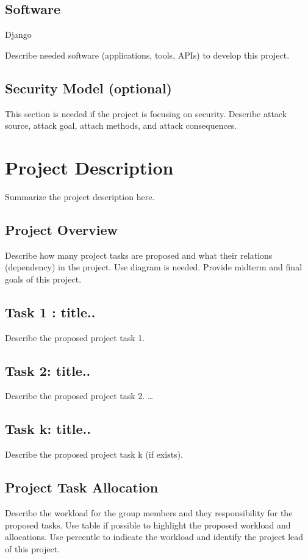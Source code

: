 \documentclass[conference,12pt]{IEEEtran}
\begin{document}
\subsection{Software}


Django \autocite{_django_2014}
\autocite{_toastdriven/django-tastypie_2014}
\autocite{_seshat_2014}
\autocite{_fritzy/sleekxmpp_2014}
\autocite{elliando_dias_django_2014}
\autocite{_twonds/punjab_2014}
\autocite{paterson_bidirectional-streams_2010}
\autocite{adam_fortuna_xmpp_2011}
\autocite{_strophe_2014}
\autocite{_ejabberd}
\autocite{steffen_larsen_xmpp}

Describe needed software (applications, tools, APIs) to develop this project.
\subsection{Security Model (optional)}
This section is needed if the project is focusing on security. Describe attack source, attack goal, attach methods, and attack consequences. 
\section{Project Description}
Summarize the project description here.
\subsection{Project Overview}
Describe how many project tasks are proposed and what their relations (dependency) in the project. Use diagram is needed. Provide midterm and final goals of this project.
\subsection{Task 1 : title..}
Describe the proposed project task 1.
\subsection{Task 2: title..}
Describe the proposed project task 2.
\dots
\subsection{Task k: title..}
Describe the proposed project task k (if exists).
\subsection{Project Task Allocation}
Describe the workload for the group members and they responsibility for the proposed tasks. Use table if possible to highlight the proposed workload and allocations. Use percentle to indicate the workload and identify the project lead of this project.
\end{document}
